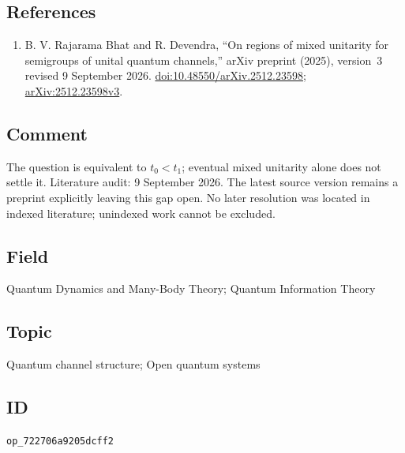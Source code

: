 \subsection*{References}

\begin{enumerate}[label={},leftmargin=4.8em,labelsep=0.5em]
  \footnotesize
  \item[\textup{[BD26]}]\label{ref:72270-bhat}
  B. V. Rajarama Bhat and R. Devendra, ``On regions of mixed unitarity
for semigroups of unital quantum channels,'' arXiv preprint (2025),
version~3 revised 9 September 2026.
\href{https://doi.org/10.48550/arXiv.2512.23598}{doi:10.48550/arXiv.2512.23598};
\href{https://arxiv.org/abs/2512.23598v3}{arXiv:2512.23598v3}.
\end{enumerate}

\subsection*{Comment}

The question is equivalent to $t_0<t_1$; eventual mixed unitarity alone
does not settle it. Literature audit: 9 September 2026. The latest source
version remains a preprint explicitly leaving this gap open. No later
resolution was located in indexed literature; unindexed work cannot be excluded.

\subsection*{Field}

Quantum Dynamics and Many-Body Theory; Quantum Information Theory

\subsection*{Topic}

Quantum channel structure; Open quantum systems

\subsection*{ID}

\texttt{op\_722706a9205dcff2}
